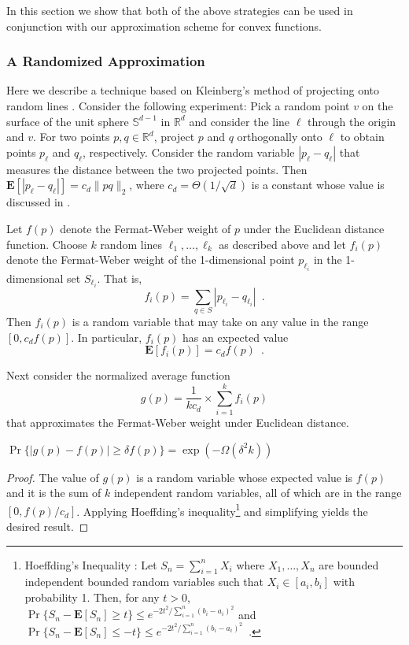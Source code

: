 \documentclass[charterfonts,lotsofwhite]{patmorin}
\newcommand{\E}{\mathbf{E}}
\begin{document}
In this section we show that both of the above strategies can be used
in conjunction with our approximation scheme for convex functions.


\subsubsection{A Randomized Approximation}

Here we describe a technique based on Kleinberg's method of projecting
onto random lines \cite{k97}.  Consider the following experiment: Pick
a random point $v$ on the surface of the unit sphere
$\mathbb{S}^{d-1}$ in $\mathbb{R}^d$ and consider the line $\ell$
through the origin and $v$. For two points $p,q\in\mathbb{R}^d$,
project $p$ and $q$ orthogonally onto $\ell$ to obtain points $p_\ell$
and $q_\ell$, respectively. Consider the random variable
$|p_\ell-q_\ell|$ that measures the distance between the two projected
points.  Then $\E[|p_\ell-q_\ell|]=c_d\|pq\|_2$, where
$c_d=\Theta(1/\sqrt{d})$ is a constant whose value is discussed in
.  

Let $f(p)$ denote the Fermat-Weber weight of $p$ under the Euclidean
distance function.  Choose $k$ random lines $\ell_1,\ldots,\ell_k$ as
described above and let $f_i(p)$ denote the Fermat-Weber weight of the
1-dimensional point $p_{\ell_i}$ in the 1-dimensional set
$S_{\ell_i}$.  That is,
\[
     f_i(p) = \sum_{q\in S} |p_{\ell_i}-q_{\ell_i}| \enspace .
\]
Then $f_i(p)$ is a random variable that may take on any value in the
range $[0,c_df(p)]$.  In particular, $f_i(p)$ has an expected value 
\[
   \E[f_i(p)]=c_df(p) \enspace . 
\] 

Next consider the normalized average function 
\[ g(p) = \frac{1}{kc_d}\times\sum_{i=1}^k f_i(p) \] 
that approximates the
Fermat-Weber weight under Euclidean distance.

\begin{lem}
$\Pr\{|g(p)-f(p)| \ge \delta f(p)\} = \exp(-\Omega(\delta^2k))$
\end{lem}

\begin{proof}
The value of $g(p)$ is a random variable whose expected value is
$f(p)$ and it is the sum of $k$ independent random variables, all of
which are in the range $[0,f(p)/c_d]$.  Applying Hoeffding's
inequality\footnote{Hoeffding's Inequality \cite{h63}: Let
$S_n=\sum_{i=1}^n X_i$ where $X_1,\ldots,X_n$ are
bounded independent bounded random variables such that $X_i\in[a_i,b_i]$ with probability 1.  Then, for any $t>0$,
$
    \Pr\{S_n - \E[S_n] \ge t\} 
   \le e^{-2t^2/\sum_{i=1}^n(b_i-a_i)^2}
$
and
$
    \Pr\{S_n - \E[S_n] \le -t\} 
   \le e^{-2t^2/\sum_{i=1}^n(b_i-a_i)^2} \enspace .
$
} and simplifying yields the desired
result.
\end{proof}
\end{document}
